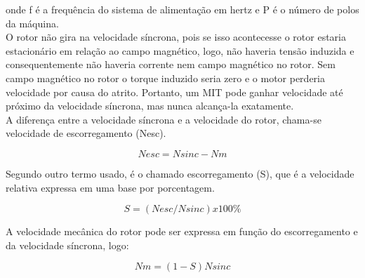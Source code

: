 onde f é a frequência do sistema de alimentação em hertz e P é o número de polos da máquina. \cite{chapman}
\\

O rotor não gira na velocidade síncrona, pois se isso acontecesse o rotor estaria estacionário em relação ao campo magnético, 
logo, não haveria tensão induzida e consequentemente não haveria corrente nem campo magnético no rotor. Sem campo magnético no 
rotor o torque induzido seria zero e o motor perderia velocidade por causa do atrito. Portanto, um MIT pode ganhar velocidade 
até próximo da velocidade síncrona, mas nunca alcança-la exatamente.\cite{chapman}
\\

A diferença entre a velocidade síncrona e a velocidade do rotor, chama-se velocidade de escorregamento (Nesc). \cite{chapman}

    \begin{equation}\label{Velocidade de Escorregamento .}
            Nesc=Nsinc-Nm
    \end{equation}


Segundo \cite{chapman} outro termo usado, é o chamado escorregamento (S), que é a velocidade relativa expressa em uma 
base por porcentagem.


  \begin{equation}\label{Escorregamento S}
           S=(Nesc/Nsinc) x 100\%
    \end{equation}

A velocidade mecânica do rotor pode ser expressa em função do escorregamento e da velocidade síncrona, logo:


  \begin{equation}\label{Velocidade Mecânica do Rotor}
         Nm=(1-S)Nsinc
    \end{equation}

